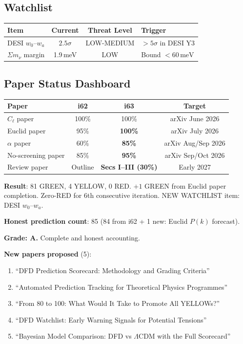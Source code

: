 \documentclass[11pt,a4paper]{article}
\begin{document}
\subsection{Watchlist}

\begin{center}
\begin{tabular}{p{4cm}ccp{4cm}}
\toprule
\textbf{Item} & \textbf{Current} & \textbf{Threat Level} & \textbf{Trigger} \\
\midrule
DESI $w_0$--$w_a$ & $2.5\sigma$ & LOW-MEDIUM & $> 5\sigma$ in DESI Y3 \\
$\Sigma m_\nu$ margin & 1.9\,meV & LOW & Bound $< 60\,\mathrm{meV}$ \\
\bottomrule
\end{tabular}
\end{center}

\subsection{Paper Status Dashboard}

\begin{center}
\begin{tabular}{lccc}
\toprule
\textbf{Paper} & \textbf{i62} & \textbf{i63} & \textbf{Target} \\
\midrule
$C_\ell$ paper & 100\% & 100\% & arXiv June 2026 \\
Euclid paper & 95\% & \textbf{100\%} & arXiv July 2026 \\
$\alpha$ paper & 60\% & \textbf{85\%} & arXiv Aug/Sep 2026 \\
No-screening paper & 85\% & \textbf{95\%} & arXiv Sep/Oct 2026 \\
Review paper & Outline & \textbf{Secs I--III (30\%)} & Early 2027 \\
\bottomrule
\end{tabular}
\end{center}

\begin{tcolorbox}[colback=green!5!white, colframe=green!60!black, title={Agent 19: Scorecard --- 81/4/0}]
\textbf{Result}: 81 GREEN, 4 YELLOW, 0 RED. $+1$ GREEN from Euclid paper completion. Zero-RED for 6th consecutive iteration. NEW WATCHLIST item: DESI $w_0$--$w_a$.

\textbf{Honest prediction count}: 85 (84 from i62 + 1 new: Euclid $P(k)$ forecast).

\textbf{Grade: A.} Complete and honest accounting.

\textbf{New papers proposed} (5):
\begin{enumerate}
\item ``DFD Prediction Scorecard: Methodology and Grading Criteria''
\item ``Automated Prediction Tracking for Theoretical Physics Programmes''
\item ``From 80 to 100: What Would It Take to Promote All YELLOWs?''
\item ``DFD Watchlist: Early Warning Signals for Potential Tensions''
\item ``Bayesian Model Comparison: DFD vs $\Lambda$CDM with the Full Scorecard''
\end{enumerate}
\end{tcolorbox}
\end{document}
